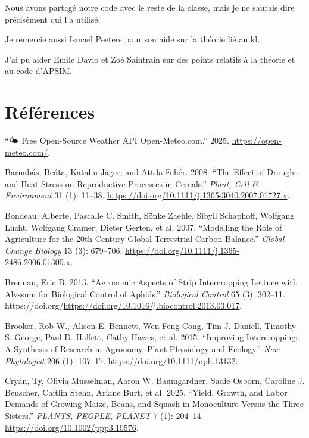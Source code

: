 \documentclass[
]{article}
\newlength{\cslhangindent}
\newenvironment{CSLReferences}[2] %
 {\begin{list}{}{%
  \setlength{\itemindent}{0pt}
  \setlength{\leftmargin}{0pt}
  \setlength{\parsep}{0pt}
  \ifodd #1
   \setlength{\leftmargin}{\cslhangindent}
   \setlength{\itemindent}{-1\cslhangindent}
  \fi
  \setlength{\itemsep}{#2\baselineskip}}}
 {\end{list}}
\begin{document}
Nous avons partagé notre code avec le reste de la classe, mais je ne
saurais dire précisément qui l'a utilisé.

Je remercie aussi Ismael Peeters pour son aide sur la théorie lié au kl.

J'ai pu aider Emile Davio et Zoé Saintrain sur des points relatifs à la
théorie et au code d'APSIM.

\newpage

\section*{Références}\label{ruxe9fuxe9rences}

\label{refs}
\begin{CSLReferences}{1}{0}
{``🌤️ {Free} {Open}-{Source} {Weather} {API} {\textbar}
{Open}-{Meteo}.com.''} 2025. \url{https://open-meteo.com/}.

Barnabás, Beáta, Katalin Jäger, and Attila Fehér. 2008. {``The Effect of
Drought and Heat Stress on Reproductive Processes in Cereals.''}
\emph{Plant, Cell \& Environment} 31 (1): 11--38.
\url{https://doi.org/10.1111/j.1365-3040.2007.01727.x}.

Bondeau, Alberte, Pascalle C. Smith, Sönke Zaehle, Sibyll Schaphoff,
Wolfgang Lucht, Wolfgang Cramer, Dieter Gerten, et al. 2007.
{``Modelling the Role of Agriculture for the 20th Century Global
Terrestrial Carbon Balance.''} \emph{Global Change Biology} 13 (3):
679--706. \url{https://doi.org/10.1111/j.1365-2486.2006.01305.x}.

Brennan, Eric B. 2013. {``Agronomic Aspects of Strip Intercropping
Lettuce with Alyssum for Biological Control of Aphids.''}
\emph{Biological Control} 65 (3): 302--11.
https://doi.org/\url{https://doi.org/10.1016/j.biocontrol.2013.03.017}.

Brooker, Rob W., Alison E. Bennett, Wen-Feng Cong, Tim J. Daniell,
Timothy S. George, Paul D. Hallett, Cathy Hawes, et al. 2015.
{``Improving Intercropping: A Synthesis of Research in Agronomy, Plant
Physiology and Ecology.''} \emph{New Phytologist} 206 (1): 107--17.
\url{https://doi.org/10.1111/nph.13132}.

Cryan, Ty, Olivia Musselman, Aaron W. Baumgardner, Sadie Osborn,
Caroline J. Beuscher, Caitlin Stehn, Ariane Burt, et al. 2025. {``Yield,
Growth, and Labor Demands of Growing Maize, Beans, and Squash in
Monoculture Versus the {Three} {Sisters}.''} \emph{PLANTS, PEOPLE,
PLANET} 7 (1): 204--14. \url{https://doi.org/10.1002/ppp3.10576}.


\end{CSLReferences}
\end{document}
